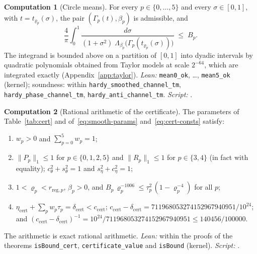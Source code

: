 \documentclass[11pt,reqno]{amsart}
\theoremstyle{definition}
\newtheorem{computation}{Computation}
\numberwithin{equation}{section}
\newcommand{\lone}[1]{\|#1\|_1}
\newcommand{\ccert}{c_{\mathrm{cert}}}
\newcommand{\dcert}{\delta_{\mathrm{cert}}}
\begin{document}
\begin{computation}[Circle means]\label{comp:mean}
For every $p\in\{0,\dots,5\}$ and every $\sigma\in[0,1]$, with $t=t_{\varrho_p}(\sigma)$, the pair $(\Gamma_p(t),\beta_p)$ is admissible, and
\[
  \frac4\pi\int_0^1\frac{d\sigma}{(1+\sigma^2)\;\Lambda_{\beta_p}\bigl(\Gamma_p(t_{\varrho_p}(\sigma))\bigr)}\;\le\;B_p .
\]
The integrand is bounded above on a partition of $[0,1]$ into dyadic intervals by quadratic polynomials obtained from Taylor models at scale $2^{-64}$, which are integrated exactly (Appendix~\ref{app:taylor}). \emph{Lean:} \texttt{mean0\_ok}, \dots, \texttt{mean5\_ok} (kernel); soundness: within \texttt{hardy\_smoothed\_channel\_tm}, \texttt{hardy\_phase\_channel\_tm}, \texttt{hardy\_anti\_channel\_tm}. \emph{Script:} .
\end{computation}

\begin{computation}[Rational arithmetic of the certificate]\label{comp:rat}
The parameters of Table~\ref{tab:cert} and of~\eqref{eq:smooth-params} and~\eqref{eq:cert-consts} satisfy:
\begin{enumerate}
  \item $w_p>0$ and $\sum_{p=0}^5w_p=1$;
  \item $\lone{P_p}\le1$ for $p\in\{0,1,2,5\}$ and $\lone{R_p}\le1$ for $p\in\{3,4\}$ (in fact with equality); $c_\theta^2+s_\theta^2=1$ and $s_\eta^2+c_\eta^2=1$;
  \item $1<\varrho_p<r_{\mathrm{reg},p}$, $\beta_p>0$, and $B_p\,\varrho_p^{-1006}\le\tau_p^2\,(1-\varrho_p^{-4})$ for all $p$;
  \item $\eta_{\mathrm{cert}}+\sum_pw_p\tau_p=\dcert<\ccert$; $\ccert-\dcert=711968053274152967940951/10^{24}$; and $(\ccert-\dcert)^{-1}=10^{24}/711968053274152967940951\le140456/100000$.
\end{enumerate}
The arithmetic is exact rational arithmetic. \emph{Lean:} within the proofs of the theorems \texttt{isBound\_cert}, \texttt{certificate\_value} and \texttt{isBound} (kernel). \emph{Script:} .
\end{computation}
\end{document}
